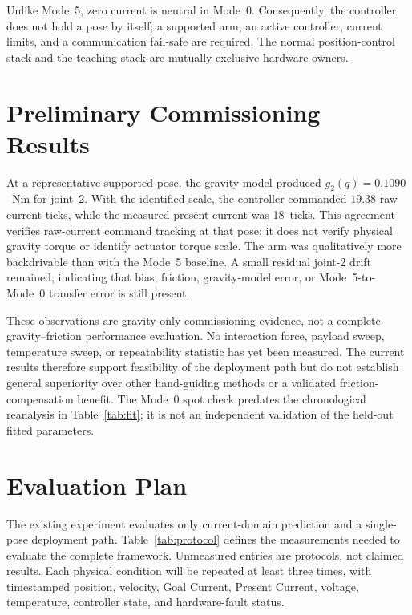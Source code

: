 \documentclass[conference]{IEEEtran}
\begin{document}
Unlike Mode~5, zero current is neutral in Mode~0. Consequently, the controller
does not hold a pose by itself; a supported arm, an active controller, current
limits, and a communication fail-safe are required. The normal position-control
stack and the teaching stack are mutually exclusive hardware owners.

\section{Preliminary Commissioning Results}
\label{sec:commissioning}
At a representative supported pose, the gravity model produced
$g_2(q)=0.1090$~Nm for joint~2. With the identified scale, the controller
commanded $19.38$ raw current ticks, while the measured present current was
18~ticks. This agreement verifies raw-current command tracking at that pose; it
does not verify physical gravity torque or identify actuator torque scale. The
arm was qualitatively more backdrivable than with the Mode~5 baseline. A small
residual joint-2 drift remained, indicating that bias, friction, gravity-model
error, or Mode~5-to-Mode~0 transfer error is still present.

These observations are gravity-only commissioning evidence, not a complete
gravity--friction performance evaluation. No interaction force, payload sweep,
temperature sweep, or repeatability statistic has yet been measured. The
current results therefore support feasibility of the deployment path but do not
establish general superiority over other hand-guiding methods or a validated
friction-compensation benefit. The Mode~0 spot check predates the chronological
reanalysis in Table~\ref{tab:fit}; it is not an independent validation of the
held-out fitted parameters.

\section{Evaluation Plan}
The existing experiment evaluates only current-domain prediction and a
single-pose deployment path. Table~\ref{tab:protocol} defines the measurements
needed to evaluate the complete framework. Unmeasured entries are protocols,
not claimed results. Each physical condition will be repeated at least three
times, with timestamped position, velocity, Goal Current, Present Current,
voltage, temperature, controller state, and hardware-fault status.
\end{document}
